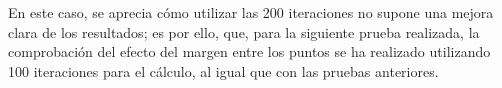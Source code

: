 \documentclass[11pt,spanish,listoffigures,listoftables]{tfgetsinf}
\makeatletter
\def\addlegendimage{\csname pgfplots@addlegendimage\endcsname}
\makeatother
\begin{document}
En este caso, se aprecia cómo utilizar las 200 iteraciones no supone una mejora clara de los resultados; es por ello, que, para la siguiente prueba realizada, la comprobación del efecto del margen entre los puntos se ha realizado utilizando 100 iteraciones para el cálculo, al igual que con las pruebas anteriores.

\begin{figure}[!htb]
    \centering
\end{figure}
\end{document}
